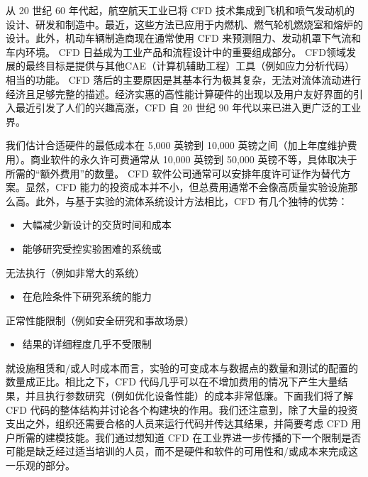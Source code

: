 \documentclass[11pt,a4paper,openany,fontset=none]{ctexbook}
\begin{document}
从 20 世纪 60 年代起，航空航天工业已将 CFD 技术集成到飞机和喷气发动机的设计、研发和制造中。最近，这些方法已应用于内燃机、燃气轮机燃烧室和熔炉的设计。此外，机动车辆制造商现在通常使用 CFD 来预测阻力、发动机罩下气流和车内环境。 CFD 日益成为工业产品和流程设计中的重要组成部分。 CFD领域发展的最终目标是提供与其他CAE（计算机辅助工程）工具（例如应力分析代码）相当的功能。 CFD 落后的主要原因是其基本行为极其复杂，无法对流体流动进行经济且足够完整的描述。经济实惠的高性能计算硬件的出现以及用户友好界面的引入最近引发了人们的兴趣高涨，CFD 自 20 世纪 90 年代以来已进入更广泛的工业界。

我们估计合适硬件的最低成本在 5,000 英镑到 10,000 英镑之间（加上年度维护费用）。商业软件的永久许可费通常从 10,000 英镑到 50,000 英镑不等，具体取决于所需的“额外费用”的数量。 CFD 软件公司通常可以安排年度许可证作为替代方案。显然，CFD 能力的投资成本并不小，但总费用通常不会像高质量实验设施那么高。此外，与基于实验的流体系统设计方法相比，CFD 有几个独特的优势：

\begin{itemize}

\item 大幅减少新设计的交货时间和成本

\item 能够研究受控实验困难的系统或

\end{itemize}

无法执行（例如非常大的系统）

\begin{itemize}

\item 在危险条件下研究系统的能力

\end{itemize}

正常性能限制（例如安全研究和事故场景）

\begin{itemize}

\item 结果的详细程度几乎不受限制

\end{itemize}

就设施租赁和/或人时成本而言，实验的可变成本与数据点的数量和测试的配置的数量成正比。相比之下，CFD 代码几乎可以在不增加费用的情况下产生大量结果，并且执行参数研究（例如优化设备性能）的成本非常低廉。下面我们将了解 CFD 代码的整体结构并讨论各个构建块的作用。我们还注意到，除了大量的投资支出之外，组织还需要合格的人员来运行代码并传达其结果，并简要考虑 CFD 用户所需的建模技能。我们通过想知道 CFD 在工业界进一步传播的下一个限制是否可能是缺乏经过适当培训的人员，而不是硬件和软件的可用性和/或成本来完成这一乐观的部分。
\end{document}
